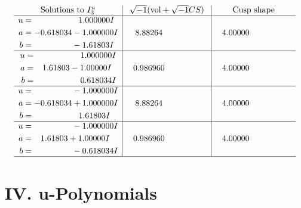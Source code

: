 \documentclass[1p]{elsarticle_modified}
\theoremstyle{definition}
\newcommand{\I}{\sqrt{-1}}
\begin{document}
$$\begin{array}{c|c|c}  
\text{Solutions to }I^u_{3}& \I (\text{vol} + \sqrt{-1}CS) & \text{Cusp shape}\\
 \hline 
\begin{aligned}
u &= \phantom{-0.000000 -}1.000000 I \\
a &= -0.618034 - 1.000000 I \\
b &= \phantom{-0.000000 } -1.61803 I\end{aligned}
 & \phantom{-}8.88264\phantom{ +0.000000I} & \phantom{-}4.00000\phantom{ +0.000000I} \\ \hline\begin{aligned}
u &= \phantom{-0.000000 -}1.000000 I \\
a &= \phantom{-}1.61803 - 1.00000 I \\
b &= \phantom{-0.000000 -}0.618034 I\end{aligned}
 & \phantom{-}0.986960\phantom{ +0.000000I} & \phantom{-}4.00000\phantom{ +0.000000I} \\ \hline\begin{aligned}
u &= \phantom{-0.000000 } -1.000000 I \\
a &= -0.618034 + 1.000000 I \\
b &= \phantom{-0.000000 -}1.61803 I\end{aligned}
 & \phantom{-}8.88264\phantom{ +0.000000I} & \phantom{-}4.00000\phantom{ +0.000000I} \\ \hline\begin{aligned}
u &= \phantom{-0.000000 } -1.000000 I \\
a &= \phantom{-}1.61803 + 1.00000 I \\
b &= \phantom{-0.000000 } -0.618034 I\end{aligned}
 & \phantom{-}0.986960\phantom{ +0.000000I} & \phantom{-}4.00000\phantom{ +0.000000I}\\
 \hline 
 \end{array}$$\newpage
\newpage\renewcommand{\arraystretch}{1}
\centering \section*{ IV. u-Polynomials}
\end{document}
